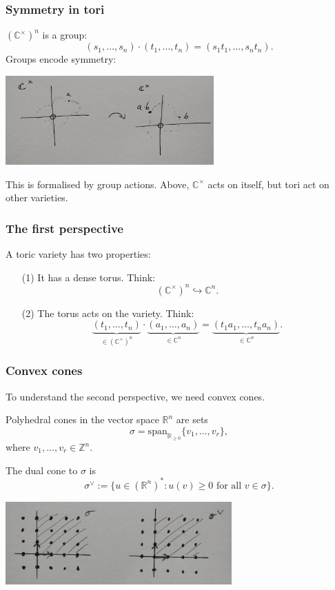 \documentclass{beamer}
\theoremstyle{definition}
\theoremstyle{definition}
\begin{document}
\begin{frame}
\frametitle{Symmetry in tori}
$(\mathbb{C}^\times)^n$ is a group:
$$(s_1, \ldots, s_n) \cdot (t_1, \ldots, t_n) = (s_1 t_1, \ldots, s_n t_n).$$
Groups encode symmetry: 

\hfill
\centerline{\includegraphics[width=0.6\textwidth]{torus_action}}

This is formalised by \alert{group actions}.
Above, $\mathbb{C}^\times$ acts on itself, but tori act on other varieties.
\end{frame}

\begin{frame}
\frametitle{The \alert{first perspective}}
A toric variety has two properties:
\begin{enumerate}
\item[(1)] It has a \alert{dense torus}.
Think:
$$(\mathbb{C}^\times)^n \hookrightarrow \mathbb{C}^n.$$
\item[(2)] The \alert{torus acts} on the variety.
Think:
$$\underbrace{(t_1, \ldots, t_n)}_{\in (\mathbb{C}^\times)^n} \cdot \underbrace{(a_1, \ldots, a_n)}_{\in \mathbb{C}^n} = \underbrace{(t_1 a_1, \ldots, t_n a_n)}_{\in \mathbb{C}^n}.$$
\end{enumerate}
\end{frame}


\begin{frame}
\frametitle{Convex cones}
To understand the \alert{second perspective}, we need convex cones.

\alert{Polyhedral cones} in the vector space $\mathbb{R}^n$ are sets
$$\sigma = \mathrm{span}_{\mathbb{R}_{\ge 0}}\{v_1, \ldots, v_r\},$$
where $v_1, \ldots, v_r \in \mathbb{Z}^n$.

The \alert{dual cone} to $\sigma$ is
$$\sigma^\vee := \{u \in (\mathbb{R}^n)^* : u(v) \ge 0 \text{ for all } v \in \sigma\}.$$

\centerline{\includegraphics[width=0.65\textwidth]{basic_cone_and_dual}}
\end{frame}
\end{document}
